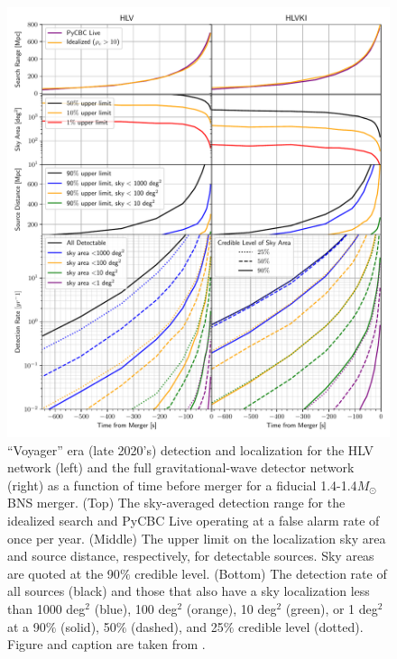 \begin{figure}
	\centering
	\includegraphics[width=\textwidth]{chapters/forecasting/images/voyager.pdf}
	\caption[``Voyager'' era detection ranges, localizations, distances, and merger rates]{``Voyager'' era (late 2020's)  detection and localization for the HLV network (left) and the full gravitational-wave detector network (right) as a function of time before merger for a fiducial 1.4-1.4$M_\odot$ BNS merger. (Top) The sky-averaged detection range for the idealized search and PyCBC Live operating at a false alarm rate of once per year. (Middle) The upper limit on the localization sky area and source distance, respectively, for detectable sources. Sky areas are quoted at the 90$\%$ credible level. (Bottom) The detection rate of all sources (black) and those that also have a sky localization less than 1000 deg$^2$ (blue), 100 deg$^2$ (orange), 10 deg$^2$ (green), or 1 deg$^2$ at a 90$\%$ (solid), 50$\%$ (dashed), and 25$\%$ credible level (dotted). Figure and caption are taken from \cite{Nitz:2020vym}.}\label{fig:res_voyager}
\end{figure}

